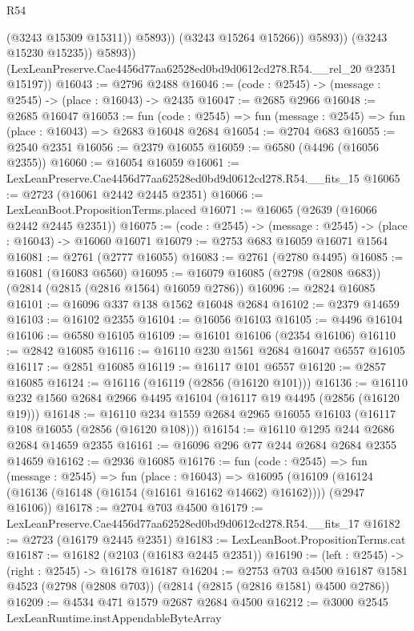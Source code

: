 \begin{lexlean}{R54}
\begin{coremodule}
                        (@3243 @15309 @15311))
                      @5893))
                  (@3243 @15264 @15266))
                @5893))
            (@3243 @15230 @15235))
          @5893))
      (LexLeanPreserve.Cae4456d77aa62528ed0bd9d0612cd278.R54.__rel_20 @2351 @15197))
@16043 := @2796 @2488
@16046 := (code : @2545) -> (message : @2545) -> (place : @16043) -> @2435
@16047 := @2685 @2966
@16048 := @2685 @16047
@16053 := fun (code : @2545) => fun (message : @2545) => fun (place : @16043) => @2683 @16048 @2684
@16054 := @2704 @683
@16055 := @2540 @2351
@16056 := @2379 @16055
@16059 := @6580 (@4496 (@16056 @2355))
@16060 := @16054 @16059
@16061 := LexLeanPreserve.Cae4456d77aa62528ed0bd9d0612cd278.R54.__fits_15
@16065 := @2723 (@16061 @2442 @2445 @2351)
@16066 := LexLeanBoot.PropositionTerms.placed
@16071 := @16065 (@2639 (@16066 @2442 @2445 @2351))
@16075 := (code : @2545) -> (message : @2545) -> (place : @16043) -> @16060 @16071
@16079 := @2753 @683 @16059 @16071 @1564
@16081 := @2761 (@2777 @16055)
@16083 := @2761 (@2780 @4495)
@16085 := @16081 (@16083 @6560)
@16095 := @16079 @16085 (@2798 (@2808 @683)) (@2814 (@2815 (@2816 @1564) @16059 @2786))
@16096 := @2824 @16085
@16101 := @16096 @337 @138 @1562 @16048 @2684
@16102 := @2379 @14659
@16103 := @16102 @2355
@16104 := @16056 @16103
@16105 := @4496 @16104
@16106 := @6580 @16105
@16109 := @16101 @16106 (@2354 @16106)
@16110 := @2842 @16085
@16116 := @16110 @230 @1561 @2684 @16047 @6557 @16105
@16117 := @2851 @16085
@16119 := @16117 @101 @6557
@16120 := @2857 @16085
@16124 := @16116 (@16119 (@2856 (@16120 @101)))
@16136 := @16110 @232 @1560 @2684 @2966 @4495 @16104 (@16117 @19 @4495 (@2856 (@16120 @19)))
@16148 := @16110 @234 @1559 @2684 @2965 @16055 @16103 (@16117 @108 @16055 (@2856 (@16120 @108)))
@16154 := @16110 @1295 @244 @2686 @2684 @14659 @2355
@16161 := @16096 @296 @77 @244 @2684 @2684 @2355 @14659
@16162 := @2936 @16085
@16176 := fun (code : @2545) =>
  fun (message : @2545) =>
  fun (place : @16043) =>
  @16095 (@16109 (@16124 (@16136 (@16148 (@16154 (@16161 @16162 @14662) @16162)))) (@2947 @16106))
@16178 := @2704 @703 @4500
@16179 := LexLeanPreserve.Cae4456d77aa62528ed0bd9d0612cd278.R54.__fits_17
@16182 := @2723 (@16179 @2445 @2351)
@16183 := LexLeanBoot.PropositionTerms.cat
@16187 := @16182 (@2103 (@16183 @2445 @2351))
@16190 := (left : @2545) -> (right : @2545) -> @16178 @16187
@16204 := @2753
    @703
    @4500
    @16187
    @1581
    @4523
    (@2798 (@2808 @703))
    (@2814 (@2815 (@2816 @1581) @4500 @2786))
@16209 := @4534 @471 @1579 @2687 @2684 @4500
@16212 := @3000 @2545 LexLeanRuntime.instAppendableByteArray

\end{coremodule}
\end{lexlean}
